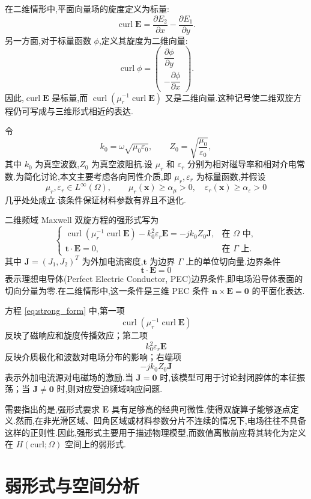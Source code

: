 \documentclass[12pt,hyperref,a4paper,UTF8,twoside]{ctexart}
\newcommand{\curl}{\operatorname{curl}}
\newcommand{\E}{\bm{E}}
\newcommand{\J}{\bm{J}}
\newcommand{\n}{\bm{n}}
\newcommand{\tvec}{\bm{t}}
\begin{document}
在二维情形中,平面向量场的旋度定义为标量:
\[
\curl \E
=
\frac{\partial E_2}{\partial x}
-
\frac{\partial E_1}{\partial y}.
\]
另一方面,对于标量函数 $\phi$,定义其旋度为二维向量:
\[
\curl \phi
=
\begin{pmatrix}
\dfrac{\partial \phi}{\partial y}\\[4pt]
-\dfrac{\partial \phi}{\partial x}
\end{pmatrix}.
\]
因此,$\curl\E$ 是标量,而 $\curl(\mu_r^{-1}\curl\E)$ 又是二维向量.这种记号使二维双旋方程仍可写成与三维形式相近的表达.

令
\[
k_0=\omega\sqrt{\mu_0\varepsilon_0},
\qquad
Z_0=\sqrt{\frac{\mu_0}{\varepsilon_0}},
\]
其中 $k_0$ 为真空波数,$Z_0$ 为真空波阻抗.设 $\mu_r$ 和 $\varepsilon_r$ 分别为相对磁导率和相对介电常数.为简化讨论,本文主要考虑各向同性介质,即 $\mu_r,\varepsilon_r$ 为标量函数,并假设
\[
\mu_r,\varepsilon_r\in L^\infty(\Omega),
\qquad
\mu_r(\bm{x})\ge \alpha_\mu>0,\quad
\varepsilon_r(\bm{x})\ge \alpha_\varepsilon>0
\]
几乎处处成立.该条件保证材料参数有界且不退化.

二维频域 Maxwell 双旋方程的强形式写为
\begin{equation}
\label{eq:strong_form}
\begin{cases}
\curl\left(\mu_r^{-1}\curl \E\right)
-
k_0^2\varepsilon_r \E
=
-jk_0Z_0\J,
& \text{在 } \Omega \text{ 中},\\[4pt]
\tvec\cdot\E=0,
& \text{在 } \Gamma \text{ 上}.
\end{cases}
\end{equation}
其中 $\J=(J_1,J_2)^T$ 为外加电流密度,$\tvec$ 为边界 $\Gamma$ 上的单位切向量.边界条件
\[
\tvec\cdot\E=0
\]
表示理想电导体(Perfect Electric Conductor, PEC)边界条件,即电场沿导体表面的切向分量为零.在二维情形中,这一条件是三维 PEC 条件 $\n\times\E=\mathbf{0}$ 的平面化表达.

方程 \eqref{eq:strong_form} 中,第一项
\[
\curl(\mu_r^{-1}\curl \E)
\]
反映了磁响应和旋度传播效应；第二项
\[
k_0^2\varepsilon_r\E
\]
反映介质极化和波数对电场分布的影响；右端项
\[
-jk_0Z_0\J
\]
表示外加电流源对电磁场的激励.当 $\J=\mathbf{0}$ 时,该模型可用于讨论封闭腔体的本征振荡；当 $\J\ne\mathbf{0}$ 时,则对应受迫频域响应问题.

需要指出的是,强形式要求 $\E$ 具有足够高的经典可微性,使得双旋算子能够逐点定义.然而,在非光滑区域、凹角区域或材料参数分片不连续的情况下,电场往往不具备这样的正则性.因此,强形式主要用于描述物理模型,而数值离散前应将其转化为定义在 $H(\text{curl};\Omega)$ 空间上的弱形式.

\section{弱形式与空间分析}
\end{document}
